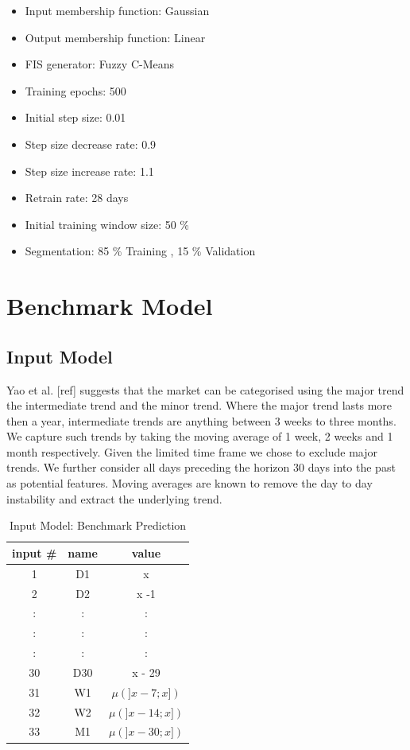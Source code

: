 \begin{itemize}
  \item Input membership function: \indent Gaussian
  \item Output membership function: \indent Linear
  \item FIS generator: \indent Fuzzy C-Means 
  \item Training epochs: 500
  \item Initial step size: 0.01
  \item Step size decrease rate: 0.9
  \item Step size increase rate: 1.1
  \item Retrain rate: 28 days
  \item Initial training window size: 50 \%
  \item Segmentation: 85 \% Training , 15 \% Validation 
\end{itemize}



\section{Benchmark Model}

\subsection{Input Model}

Yao et al. [ref] suggests that the market can be categorised using the major trend the intermediate trend and the minor trend. Where the major trend lasts more then a year, intermediate trends are anything between 3 weeks to three months. We capture such trends by taking the moving average of 1 week, 2 weeks and 1 month respectively. Given the limited time frame we chose to exclude major trends. We further consider all days preceding the horizon 30 days into the past as potential features. Moving averages are known to remove the day to day instability and extract the underlying trend.


\begin{table}[H]
\centering
\begin{tabular}{ |c|c|c| } 

 input \# & name & value \\ 
  \hline
 1 & D1 & x \\ 
 2 & D2 & x -1 \\ 
 :& : & : \\ 
  :& : & : \\ 
  :& : & : \\ 
  30 & D30 & x - 29\\ 
  31 & W1 & $\mu(]x-7;x])$ \\ 
  32 & W2 & $\mu(]x-14;x])$ \\ 
  33 & M1 & $\mu(]x-30;x])$ \\ 
 

\end{tabular}
\caption{Input Model: Benchmark Prediction}
\label{tab:abc}
\end{table}


